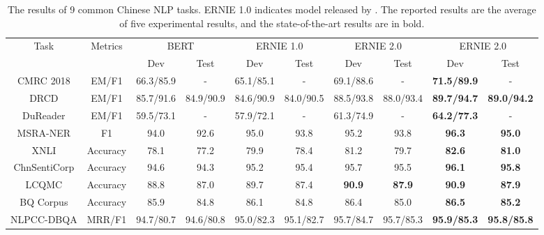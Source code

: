 \documentclass[letterpaper]{article} \usepackage{aaai20}  \usepackage{times}  \usepackage{helvet} \usepackage{courier}  \usepackage[hyphens]{url}  \usepackage{graphicx} \usepackage{makecell}
\begin{document}
\begin{table*}[htbp]
\centering
  \small
\begin{tabular}{c|c|cc|cc|cc|cc}
\hline \hline
\multirow{2}{*}{Task} & \multirow{2}{*}{Metrics} & \multicolumn{2}{c|}{BERT} & \multicolumn{2}{c|}{ERNIE 1.0} & \multicolumn{2}{c|}{ERNIE 2.0} & \multicolumn{2}{c}{ERNIE 2.0} \\ \cline{3-10} 
                      &                          & Dev         & Test        & Dev               & Test             & Dev                 & Test               & Dev                 & Test                \\ \hline
CMRC 2018             & EM/F1                    & 66.3/85.9   & -           & 65.1/85.1         & -                & 69.1/88.6           & -                  & \textbf{71.5/89.9}  & -                   \\
DRCD                  & EM/F1                    & 85.7/91.6   & 84.9/90.9   & 84.6/90.9         & 84.0/90.5        & 88.5/93.8           & 88.0/93.4          & \textbf{89.7/94.7}  & \textbf{89.0/94.2}  \\
DuReader              & EM/F1                    & 59.5/73.1   & -           & 57.9/72.1         & -                & 61.3/74.9           & -                  & \textbf{64.2/77.3}  & -                   \\
MSRA-NER              & F1                       & 94.0        & 92.6        & 95.0              & 93.8             & 95.2                & 93.8               & \textbf{96.3}       & \textbf{95.0}       \\
XNLI                  & Accuracy                 & 78.1        & 77.2        & 79.9              & 78.4             & 81.2                & 79.7               & \textbf{82.6}       & \textbf{81.0}       \\
ChnSentiCorp          & Accuracy                 & 94.6        & 94.3       & 95.2              & 95.4             & 95.7                & 95.5               & \textbf{96.1}       & \textbf{95.8}       \\
LCQMC                 & Accuracy                 & 88.8        & 87.0        & 89.7              & 87.4             & \textbf{90.9}       & \textbf{87.9}      & \textbf{90.9}       & \textbf{87.9}       \\
BQ Corpus             & Accuracy                 & 85.9        & 84.8        & 86.1              & 84.8             & 86.4                & 85.0               & \textbf{86.5}       & \textbf{85.2}       \\
NLPCC-DBQA            & MRR/F1                   & 94.7/80.7   & 94.6/80.8   & 95.0/82.3         & 95.1/82.7        & 95.7/84.7           & 95.7/85.3          & \textbf{95.9/85.3}           & \textbf{95.8/85.8}           \\ \hline \hline

\end{tabular}
\caption{The results of 9 common Chinese NLP tasks. ERNIE 1.0 indicates model released by \protect\cite[ERNIE]{sun2019ernie} . The reported results are the average of five experimental results, and the state-of-the-art results are in bold.}
  \label{finetune_table}
\end{table*}
\end{document}
